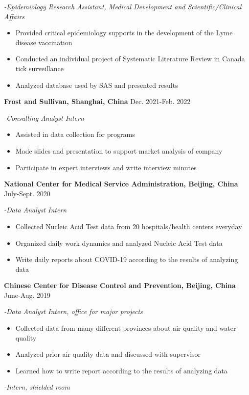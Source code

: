 \documentclass[
  a4paper,
]{article}
\providecommand{\tightlist}{%
  \setlength{\itemsep}{0pt}\setlength{\parskip}{0pt}}
\begin{document}
\emph{-Epidemiology Research Assistant, Medical Development and Scientific/Clinical Affairs}

\begin{itemize}
\tightlist
\item Provided critical epidemiology supports in the development of the Lyme disease vaccination
\item Conducted an individual project of Systematic Literature Review in Canada tick surveillance
\item Analyzed database used by SAS and presented results
\end{itemize}
\textbf{Frost and Sullivan, Shanghai, China} \hfill Dec. 2021-Feb. 2022

\emph{-Consulting Analyst Intern}

\begin{itemize}
\tightlist
\item Assisted in data collection for programs
\item Made slides and presentation to support market analysis of company
\item Participate in expert interviews and write interview minutes
\end{itemize}
\textbf{National Center for Medical Service Administration, Beijing, China} \hfill July-Sept. 2020

\emph{-Data Analyst Intern}

\begin{itemize}
\tightlist
\item Collected Nucleic Acid Test data from 20 hospitals/health centers everyday
\item Organized daily work dynamics and analyzed Nucleic Acid Test data
\item Write daily reports about COVID-19 according to the results of analyzing data
\end{itemize}
\textbf{Chinese Center for Disease Control and Prevention, Beijing, China} \hfill June-Aug. 2019

\emph{-Data Analyst Intern, office for major projects}

\begin{itemize}
\tightlist
\item Collected data from many different provinces about air quality and water quality
\item Analyzed prior air quality data and discussed with supervisor
\item Learned how to write report according to the results of analyzing data
\end{itemize}
\emph{-Intern, shielded room}
\end{document}
